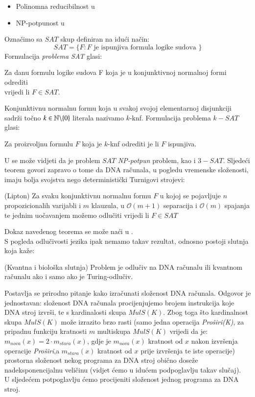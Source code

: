 \documentclass[a4paper,oneside,12pt]{memoir} %
\begin{document}
\begin{spacing}{1.5}
\begin{itemize}
 	\item Polinomna reducibilnost u \cite[s. ~272]{Sipser}
 	\item NP-potpunost u \cite[s. ~276]{Sipser}
\end{itemize}
Označimo sa $SAT$ skup definiran na idući način:
\[SAT=\{F: F \textrm{ je ispunjiva formula logike sudova }\}\]
Formulacija \textit{problema SAT} glasi:\\
\begin{center}
Za danu formulu logike sudova F koja je u konjunktivnoj normalnoj formi odrediti\\ vrijedi li $F \in  SAT$.
\end{center}
Konjunktivnu normalnu formu koja u svakoj svojoj elementarnoj disjunkciji sadrži točno $k \in \mathbb{N} \backslash \{0\}$ literala nazivamo $k$-knf. Formulacija problema $k-SAT$ glasi:
\begin{center}
	Za proizvoljnu formulu $F$ koja je $k$-knf odrediti je li $F$ ispunjiva. 
\end{center} 
U \cite[s. ~276-283]{Sipser} se može vidjeti da je problem $SAT$ \textit{NP-potpun} problem, kao i $3-SAT$.
Sljedeći teorem govori zapravo o tome da DNA računala, u pogledu vremenske složenosti, imaju bolja svojstva nego deterministički Turnigovi strojevi:
\begin{thm} (Lipton)
Za svaku konjunktivnu normalnu formu $F$ u kojoj se pojavljuje $n$ propozicionalih varijabli i $m$ klauzula, u $\mathcal{O}(m+1)$ separacija i $\mathcal{O}(m)$ spajanja te jednim uočavanjem možemo odlučiti vrijedi li $F \in SAT$
\end{thm}
Dokaz navedenog teorema se može naći u \cite{Lipton}.\\
S pogleda odlučivosti jezika ipak nemamo takav rezultat, odnosno postoji slutnja koja kaže:
\begin{conj} (Kvantna i biološka slutnja) Problem je odlučiv na DNA računalu ili kvantnom računalu ako i samo ako je Turing-odlučiv.
\end{conj}
Postavlja se prirodno pitanje kako izračunati složenost DNA računala. Odgovor je jednostavan: složenost DNA računala procijenjujemo brojem instrukcija koje DNA stroj izvrši, te s kardinalosti skupa $MulS(K)$. Zbog toga što kardinalnost skupa $MulS(K)$ može izrazito brzo rasti (samo jedna operacija \textit{Proširi(K)}, za pripadnu funkciju kratnosti $m$ multiskupa $MulS(K)$ vrijedi da je: $m_{nova}(x)=2\cdot m_{stara}(x)$, gdje je $m_{nova}(x)$ kratnost od $x$ nakon izvršenja operacije \textit{Proširi},a $m_{stara}(x)$ kratnost od $x$ prije izvršenja te iste operacije) prostorna složenost nekog programa za DNA stroj obično doseže nadeksponencijalnu veličinu (vidjet ćemo u idućem podpoglavlju takav slučaj). \\
U sljedećem potpoglavlju ćemo procijeniti složenost jednog programa za DNA stroj.

\end{spacing}
\end{document}
